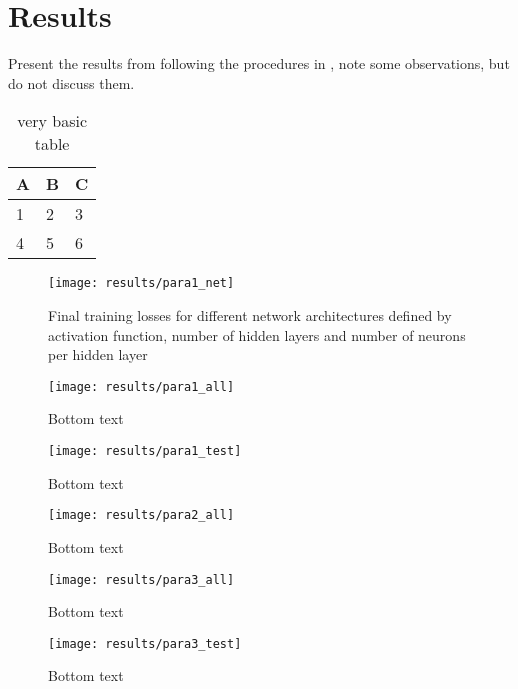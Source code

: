 \chapter{Results}\label{CH5}
Present the results from following the procedures in , note some observations, but do not discuss them.

\begin{table}[h]
    \centering
    \begin{tabular}{l | l | l}
    A & B & C \\
    \hline
    1 & 2 & 3 \\
    4 & 5 & 6
    \end{tabular}
    \caption{very basic table}
    \label{tab:abc}
    \end{table}

\begin{figure}
    \centering
    \texttt{[image: results/para1\_net]}
    \caption{Final training losses for different network architectures defined by activation function, number of hidden layers and number of neurons per hidden layer}
    \label{fig:para1_net}
\end{figure}

\begin{figure}
    \centering
    \texttt{[image: results/para1\_all]}
    \caption{Bottom text}
    \label{fig:para1_all}
\end{figure}

\begin{figure}
    \centering
    \texttt{[image: results/para1\_test]}
    \caption{Bottom text}
    \label{fig:para1_test}
\end{figure}

\begin{figure}
    \centering
    \texttt{[image: results/para2\_all]}
    \caption{Bottom text}
    \label{fig:para2_all}
\end{figure}

\begin{figure}
    \centering
    \texttt{[image: results/para3\_all]}
    \caption{Bottom text}
    \label{fig:para3_all}
\end{figure}

\begin{figure}
    \centering
    \texttt{[image: results/para3\_test]}
    \caption{Bottom text}
    \label{fig:para3_test}
\end{figure}

